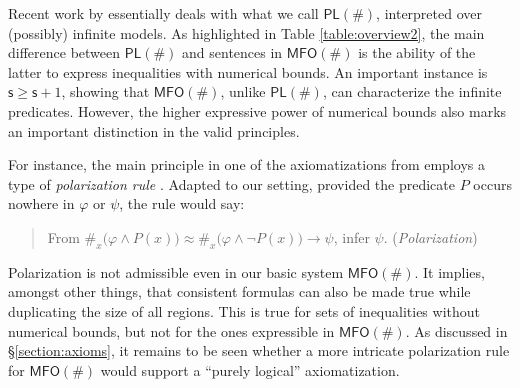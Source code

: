 \documentclass[12pt,oneside,reqno]{amsart}
\theoremstyle{definition}
\begin{document}
Recent work by \cite{Ding2020} essentially deals with what we call $\mathsf{PL}(\#)$, interpreted over (possibly) infinite models.  As highlighted in Table \ref{table:overview2}, the main difference between $\mathsf{PL}(\#)$ and sentences in $\mathsf{MFO}(\#)$ is the ability of the latter to express inequalities with numerical bounds. An important instance is $\mathsf{s} \geq  \mathsf{s} +1$, showing that $\mathsf{MFO}(\#)$, unlike $\mathsf{PL}(\#)$, can characterize the infinite predicates. However, the higher expressive power of numerical bounds also marks an important distinction in the valid principles. 

For instance, the main principle in one of the axiomatizations from \cite{Ding2020} employs a type of \emph{polarization rule} \citep{kps59,Burgess2010}. Adapted to our setting, provided the predicate $P$ occurs nowhere in $\varphi$ or $\psi$, the rule would say: \begin{quote} From $\#_x\big(\varphi \wedge P(x)\big)\approx \#_x\big(\varphi \wedge \neg P(x)\big) \rightarrow \psi$, infer $\psi$. \hfill (\emph{Polarization}) \end{quote} Polarization is not admissible even in our basic system $\mathsf{MFO}(\#)$. It implies, amongst other things, that consistent formulas can also be made true while duplicating the size of all regions. This is true for sets of inequalities without numerical bounds, but not for the ones expressible in $\mathsf{MFO}(\#)$.
As discussed in \S\ref{section:axioms}, it remains to be seen whether a more intricate polarization rule for $\mathsf{MFO}(\#)$ would support a ``purely logical'' axiomatization. 

\end{document}
